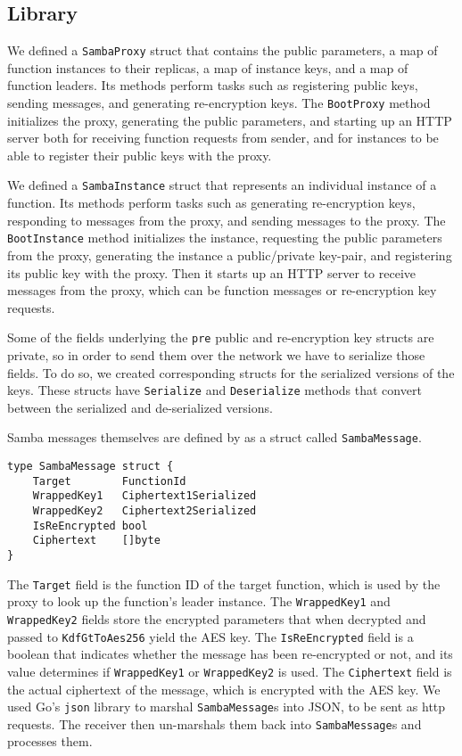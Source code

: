 \subsection{\SystemName Library}

We defined a \texttt{Samba\-Proxy} struct that contains the public parameters, a map of function instances to their replicas, a map of instance keys, and a map of function leaders.
Its methods perform tasks such as registering public keys, sending messages, and generating re-encryption keys.
The \texttt{BootProxy} method initializes the proxy, generating the public parameters, and starting up an HTTP server both for receiving function requests from sender, and for instances to be able to register their public keys with the proxy.

We defined a \texttt{Samba\-Instance} struct that represents an individual instance of a function.
Its methods perform tasks such as generating re-encryption keys, responding to messages from the proxy, and sending messages to the proxy.
The \texttt{BootInstance} method initializes the instance, requesting the public parameters from the proxy, generating the instance a public/private key-pair, and registering its public key with the proxy.
Then it starts up an HTTP server to receive messages from the proxy, which can be function messages or re-encryption key requests.

Some of the fields underlying the \texttt{pre} public and re-encryption key structs are private, so in order to send them over the network we have to serialize those fields.
To do so, we created corresponding structs for the serialized versions of the keys.
These structs have \texttt{Serialize} and \texttt{Deserialize} methods that convert between the serialized and de-serialized versions.

Samba messages themselves are defined by as a struct called \texttt{Samba\-Message}.
\begin{lstlisting}
type SambaMessage struct {
	Target        FunctionId
	WrappedKey1   Ciphertext1Serialized
	WrappedKey2   Ciphertext2Serialized
	IsReEncrypted bool
	Ciphertext    []byte
}
\end{lstlisting}

The \texttt{Target} field is the function ID of the target function, which is used by the proxy to look up the function's leader instance.
The \texttt{WrappedKey1} and \texttt{WrappedKey2} fields store the encrypted parameters that when decrypted and passed to \texttt{KdfGtToAes256} yield the AES key.
The \texttt{IsReEncrypted} field is a boolean that indicates whether the message has been re-encrypted or not, and its value determines if \texttt{WrappedKey1} or \texttt{WrappedKey2} is used.
The \texttt{Ciphertext} field is the actual ciphertext of the message, which is encrypted with the AES key.
We used Go's \texttt{json} library to marshal \texttt{Samba\-Message}s into JSON, to be sent as http requests.
The receiver then un-marshals them back into \texttt{Samba\-Message}s and processes them.

